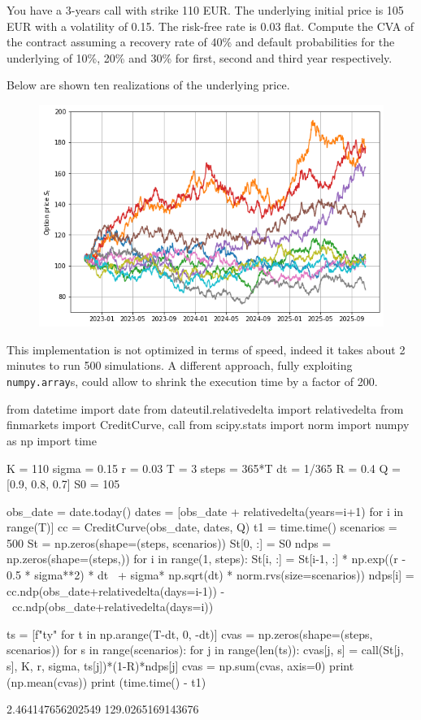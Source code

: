 \begin{question}
You have a 3-years call with strike 110 EUR. The underlying initial price is 105 EUR with a volatility of 0.15. The risk-free rate is 0.03 flat.
Compute the CVA of the contract assuming a recovery rate of 40\% and default probabilities for the underlying of 10\%, 20\% and 30\% for first, second and third year respectively.
\end{question}

\cprotEnv\begin{solution}
Below are shown ten realizations of the underlying price.

\begin{figure}[htbp]
\centering
\includegraphics[width=0.7\linewidth]{figures/underlying_simulation}
\end{figure}

This implementation is not optimized in terms of speed, indeed it takes about 2 minutes to run 500 simulations.
A different approach, fully exploiting \texttt{numpy.array}s, could allow to shrink the execution time by a factor of 200.

\begin{ipython}
from datetime import date
from dateutil.relativedelta import relativedelta
from finmarkets import CreditCurve, call
from scipy.stats import norm
import numpy as np
import time

K = 110
sigma = 0.15
r = 0.03
T = 3
steps = 365*T
dt = 1/365
R = 0.4
Q = [0.9, 0.8, 0.7]
S0 = 105

obs_date = date.today()
dates = [obs_date + relativedelta(years=i+1) for i in range(T)]
cc = CreditCurve(obs_date, dates, Q)
t1 = time.time()
scenarios = 500
St = np.zeros(shape=(steps, scenarios))
St[0, :] = S0
ndps = np.zeros(shape=(steps,))
for i in range(1, steps):
    St[i, :] = St[i-1, :] * np.exp((r - 0.5 * sigma**2) * dt \
        + sigma* np.sqrt(dt) * norm.rvs(size=scenarios))
    ndps[i] = cc.ndp(obs_date+relativedelta(days=i-1)) - \
        cc.ndp(obs_date+relativedelta(days=i))

ts = [f"{t}y" for t in np.arange(T-dt, 0, -dt)]
cvas = np.zeros(shape=(steps, scenarios))
for s in range(scenarios):
    for j in range(len(ts)):
        cvas[j, s] = call(St[j, s], K, r, sigma, ts[j])*(1-R)*ndps[j]
cvas = np.sum(cvas, axis=0)
print (np.mean(cvas))
print (time.time() - t1)
\end{ipython}
\begin{ioutput}
2.464147656202549
129.0265169143676
\end{ioutput}
\end{solution}

